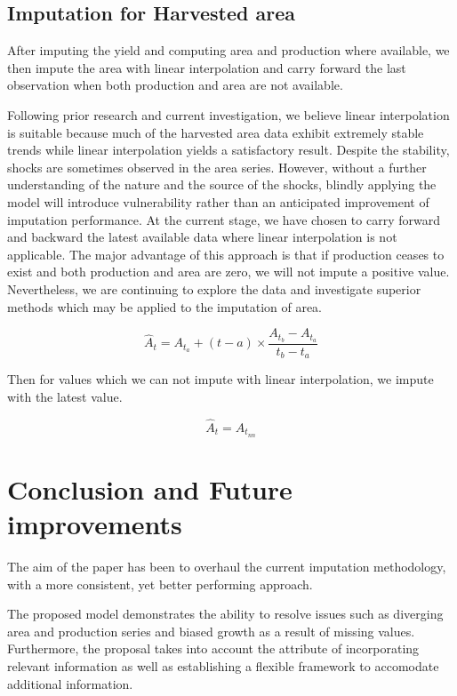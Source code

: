 \documentclass[nojss]{jss}\usepackage{graphicx, color}
\begin{document}
\subsection{Imputation for Harvested area}
After imputing the yield and computing area and production where
available, we then impute the area with linear interpolation and carry
forward the last observation when both production and area are not
available.

Following prior research and current investigation, we believe linear
interpolation is suitable because much of the harvested area data
exhibit extremely stable trends while linear interpolation yields a
satisfactory result. Despite the stability, shocks are sometimes
observed in the area series.  However, without a further understanding
of the nature and the source of the shocks, blindly applying the model
will introduce vulnerability rather than an anticipated improvement of
imputation performance. At the current stage, we have chosen to carry
forward and backward the latest available data where linear
interpolation is not applicable. The major advantage of this approach
is that if production ceases to exist and both production and area are
zero, we will not impute a positive value. Nevertheless, we are
continuing to explore the data and investigate superior methods which
may be applied to the imputation of area.


\begin{equation}
  \label{eq:linearInterpolation}
  \hat{A}_t = A_{t_a} + (t - a) \times \frac{A_{t_b} - A_{t_a}}{t_b - t_a}
\end{equation}

Then for values which we can not impute with linear interpolation, we
impute with the latest value.

\begin{equation}
  \label{eq:locf}
  \hat{A}_t = A_{t_{nn}}
\end{equation}


\section{Conclusion and Future improvements}
The aim of the paper has been to overhaul the current imputation
methodology, with a more consistent, yet better performing approach.

The proposed model demonstrates the ability to resolve issues such as
diverging area and production series and biased growth as a result of
missing values. Furthermore, the proposal takes into account the
attribute of incorporating relevant information as well as
establishing a flexible framework to accomodate additional
information.
\end{document}

